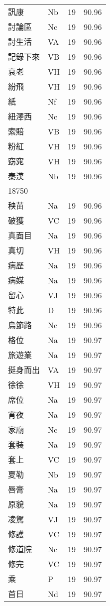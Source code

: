 \documentclass[twocolumn]{book}
\begin{document}
\begin{supertabular}{llrr}
訊康 & Nb & 19 &  90.96\\
討論區 & Nc & 19 &  90.96\\
討生活 & VA & 19 &  90.96\\
記錄下來 & VB & 19 &  90.96\\
衰老 & VH & 19 &  90.96\\
紛飛 & VH & 19 &  90.96\\
紙 & Nf & 19 &  90.96\\
紐澤西 & Nc & 19 &  90.96\\
索賠 & VB & 19 &  90.96\\
粉紅 & VH & 19 &  90.96\\
窈窕 & VH & 19 &  90.96\\
秦漢 & Nb & 19 &  90.96\\
18750\\
秧苗 & Na & 19 &  90.96\\
破獲 & VC & 19 &  90.96\\
真面目 & Na & 19 &  90.96\\
真切 & VH & 19 &  90.96\\
病歷 & Na & 19 &  90.96\\
病媒 & Na & 19 &  90.96\\
留心 & VJ & 19 &  90.96\\
特此 & D & 19 &  90.96\\
烏節路 & Nc & 19 &  90.96\\
格位 & Na & 19 &  90.97\\
旅遊業 & Na & 19 &  90.97\\
挺身而出 & VA & 19 &  90.97\\
徐徐 & VH & 19 &  90.97\\
席位 & Na & 19 &  90.97\\
宵夜 & Na & 19 &  90.97\\
家廟 & Nc & 19 &  90.97\\
套裝 & Na & 19 &  90.97\\
套上 & VC & 19 &  90.97\\
夏勒 & Nb & 19 &  90.97\\
唇膏 & Na & 19 &  90.97\\
原貌 & Na & 19 &  90.97\\
凌駕 & VJ & 19 &  90.97\\
修護 & VC & 19 &  90.97\\
修道院 & Nc & 19 &  90.97\\
修完 & VC & 19 &  90.97\\
乘 & P & 19 &  90.97\\
首日 & Nd & 19 &  90.97\\

\end{supertabular}
\end{document}

